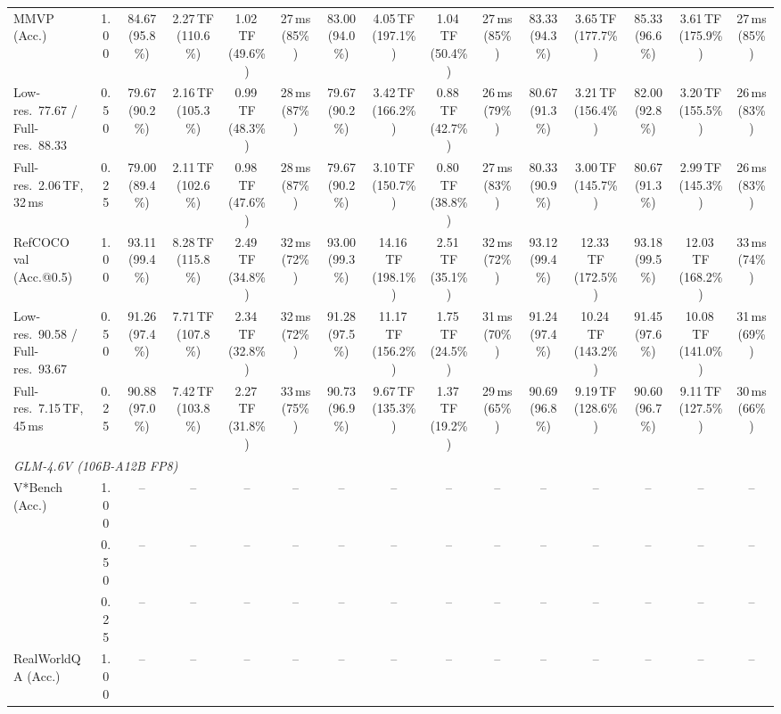 \begin{table}[t]
{\begin{tabular}{l c | c c c c | c c c c | c c | c c c}
\cmidrule(lr){1-15}
MMVP (Acc.) & 1.00 & 84.67 (95.8\%) & 2.27\,TF (110.6\%) & 1.02\,TF (49.6\%) & 27\,ms (85\%) & 83.00 (94.0\%) & 4.05\,TF (197.1\%) & 1.04\,TF (50.4\%) & 27\,ms (85\%) & 83.33 (94.3\%) & 3.65\,TF (177.7\%) & 85.33 (96.6\%) & 3.61\,TF (175.9\%) & 27\,ms (85\%) \\
{\footnotesize Low-res.\ 77.67 / Full-res.\ 88.33} & 0.50 & 79.67 (90.2\%) & 2.16\,TF (105.3\%) & 0.99\,TF (48.3\%) & 28\,ms (87\%) & 79.67 (90.2\%) & 3.42\,TF (166.2\%) & 0.88\,TF (42.7\%) & 26\,ms (79\%) & 80.67 (91.3\%) & 3.21\,TF (156.4\%) & 82.00 (92.8\%) & 3.20\,TF (155.5\%) & 26\,ms (83\%) \\
{\footnotesize Full-res.\ 2.06\,TF, 32\,ms} & 0.25 & 79.00 (89.4\%) & 2.11\,TF (102.6\%) & 0.98\,TF (47.6\%) & 28\,ms (87\%) & 79.67 (90.2\%) & 3.10\,TF (150.7\%) & 0.80\,TF (38.8\%) & 27\,ms (83\%) & 80.33 (90.9\%) & 3.00\,TF (145.7\%) & 80.67 (91.3\%) & 2.99\,TF (145.3\%) & 26\,ms (83\%) \\
\cmidrule(lr){1-15}
RefCOCO val (Acc.@0.5) & 1.00 & \cellcolor{gray!15}93.11 (99.4\%) & 8.28\,TF (115.8\%) & 2.49\,TF (34.8\%) & 32\,ms (72\%) & \cellcolor{gray!15}93.00 (99.3\%) & 14.16\,TF (198.1\%) & 2.51\,TF (35.1\%) & 32\,ms (72\%) & \cellcolor{gray!15}93.12 (99.4\%) & 12.33\,TF (172.5\%) & \cellcolor{gray!15}93.18 (99.5\%) & 12.03\,TF (168.2\%) & 33\,ms (74\%) \\
{\footnotesize Low-res.\ 90.58 / Full-res.\ 93.67} & 0.50 & 91.26 (97.4\%) & 7.71\,TF (107.8\%) & 2.34\,TF (32.8\%) & 32\,ms (72\%) & 91.28 (97.5\%) & 11.17\,TF (156.2\%) & 1.75\,TF (24.5\%) & 31\,ms (70\%) & 91.24 (97.4\%) & 10.24\,TF (143.2\%) & 91.45 (97.6\%) & 10.08\,TF (141.0\%) & 31\,ms (69\%) \\
{\footnotesize Full-res.\ 7.15\,TF, 45\,ms} & 0.25 & 90.88 (97.0\%) & 7.42\,TF (103.8\%) & 2.27\,TF (31.8\%) & 33\,ms (75\%) & 90.73 (96.9\%) & 9.67\,TF (135.3\%) & 1.37\,TF (19.2\%) & 29\,ms (65\%) & 90.69 (96.8\%) & 9.19\,TF (128.6\%) & 90.60 (96.7\%) & 9.11\,TF (127.5\%) & 30\,ms (66\%) \\
\midrule
\multicolumn{15}{l}{\emph{GLM-4.6V (106B-A12B FP8)}} \\
V*Bench (Acc.) & 1.00 & -- & -- & -- & -- & -- & -- & -- & -- & -- & -- & -- & -- & -- \\
 & 0.50 & -- & -- & -- & -- & -- & -- & -- & -- & -- & -- & -- & -- & -- \\
 & 0.25 & -- & -- & -- & -- & -- & -- & -- & -- & -- & -- & -- & -- & -- \\
\cmidrule(lr){1-15}
RealWorldQA (Acc.) & 1.00 & -- & -- & -- & -- & -- & -- & -- & -- & -- & -- & -- & -- & -- \\

\end{tabular}}
\end{table}
